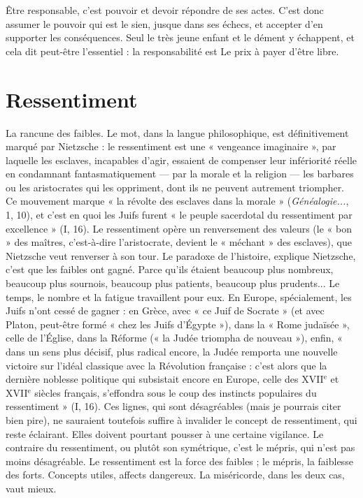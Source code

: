 Être responsable, c’est pouvoir et devoir répondre de ses actes. C’est donc
assumer le pouvoir qui est le sien, jusque dans ses échecs, et accepter d’en supporter
les conséquences. Seul le très jeune enfant et le dément y échappent, et
cela dit peut-être l'essentiel : la responsabilité est Le prix à payer d’être libre.

\section{Ressentiment}
La rancune des faibles. Le mot, dans la langue philosophique,
est définitivement marqué par Nietzsche : le ressentiment
est une « vengeance imaginaire », par laquelle les esclaves, incapables
d’agir, essaient de compenser leur infériorité réelle en condamnant fantasmatiquement
— par la morale et la religion — les barbares ou les aristocrates qui les
oppriment, dont ils ne peuvent autrement triompher. Ce mouvement marque
« la révolte des esclaves dans la morale » ({\it Généalogie...}, 1, 10), et c’est en quoi
les Juifs furent « le peuple sacerdotal du ressentiment par excellence » (I, 16).
Le ressentiment opère un renversement des valeurs (le « bon » des maîtres,
c’est-à-dire l’aristocrate, devient le « méchant » des esclaves), que Nietzsche
veut renverser à son tour. Le paradoxe de l’histoire, explique Nietzsche, c’est
que les faibles ont gagné. Parce qu’ils étaient beaucoup plus nombreux, beaucoup
plus sournois, beaucoup plus patients, beaucoup plus prudents... Le
temps, le nombre et la fatigue travaillent pour eux. En Europe, spécialement,
les Juifs n’ont cessé de gagner : en Grèce, avec « ce Juif de Socrate » (et avec
Platon, peut-être formé « chez les Juifs d'Égypte »), dans la « Rome judaïsée »,
celle de l'Église, dans la Réforme (« la Judée triompha de nouveau »), enfin,
« dans un sens plus décisif, plus radical encore, la Judée remporta une nouvelle
victoire sur l’idéal classique avec la Révolution française : c’est alors que la
dernière noblesse politique qui subsistait encore en Europe, celle des {\footnotesize XVII$^\text{e}$} et
{\footnotesize XVII$^\text{e}$} siècles français, s’effondra sous le coup des instincts populaires du ressentiment »
(I, 16). Ces lignes, qui sont désagréables (mais je pourrais citer bien
pire), ne sauraient toutefois suffire à invalider le concept de ressentiment, qui
reste éclairant. Elles doivent pourtant pousser à une certaine vigilance. Le
contraire du ressentiment, ou plutôt son symétrique, c’est le mépris, qui n’est
pas moins désagréable. Le ressentiment est la force des faibles ; le mépris, la faiblesse
des forts. Concepts utiles, affects dangereux. La miséricorde, dans les
deux cas, vaut mieux.

